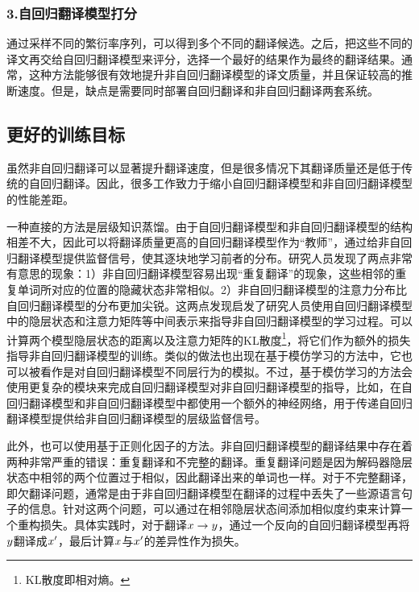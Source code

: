 \subsubsection{3.自回归翻译模型打分}

\parinterval 通过采样不同的繁衍率序列，可以得到多个不同的翻译候选。之后，把这些不同的译文再交给自回归翻译模型来评分，选择一个最好的结果作为最终的翻译结果。通常，这种方法能够很有效地提升非自回归翻译模型的译文质量，并且保证较高的推断速度。但是，缺点是需要同时部署自回归翻译和非自回归翻译两套系统。


\subsection{更好的训练目标}

\parinterval 虽然非自回归翻译可以显著提升翻译速度，但是很多情况下其翻译质量还是低于传统的自回归翻译。因此，很多工作致力于缩小自回归翻译模型和非自回归翻译模型的性能差距。

\parinterval 一种直接的方法是层级知识蒸馏。由于自回归翻译模型和非自回归翻译模型的结构相差不大，因此可以将翻译质量更高的自回归翻译模型作为“教师”，通过给非自回归翻译模型提供监督信号，使其逐块地学习前者的分布。研究人员发现了两点非常有意思的现象：1）非自回归翻译模型容易出现“重复翻译”的现象，这些相邻的重复单词所对应的位置的隐藏状态非常相似。2）非自回归翻译模型的注意力分布比自回归翻译模型的分布更加尖锐。这两点发现启发了研究人员使用自回归翻译模型中的隐层状态和注意力矩阵等中间表示来指导非自回归翻译模型的学习过程。可以计算两个模型隐层状态的距离以及注意力矩阵的KL散度\footnote{KL散度即相对熵。}，将它们作为额外的损失指导非自回归翻译模型的训练。类似的做法也出现在基于模仿学习的方法中，它也可以被看作是对自回归翻译模型不同层行为的模拟。不过，基于模仿学习的方法会使用更复杂的模块来完成自回归翻译模型对非自回归翻译模型的指导，比如，在自回归翻译模型和非自回归翻译模型中都使用一个额外的神经网络，用于传递自回归翻译模型提供给非自回归翻译模型的层级监督信号。

\parinterval 此外，也可以使用基于正则化因子的方法。非自回归翻译模型的翻译结果中存在着两种非常严重的错误：重复翻译和不完整的翻译。重复翻译问题是因为解码器隐层状态中相邻的两个位置过于相似，因此翻译出来的单词也一样。对于不完整翻译，即欠翻译问题，通常是由于非自回归翻译模型在翻译的过程中丢失了一些源语言句子的信息。针对这两个问题，可以通过在相邻隐层状态间添加相似度约束来计算一个重构损失。具体实践时，对于翻译${x}\to{y}$，通过一个反向的自回归翻译模型再将${y}$翻译成${x'}$，最后计算${x}$与${x'}$的差异性作为损失。


